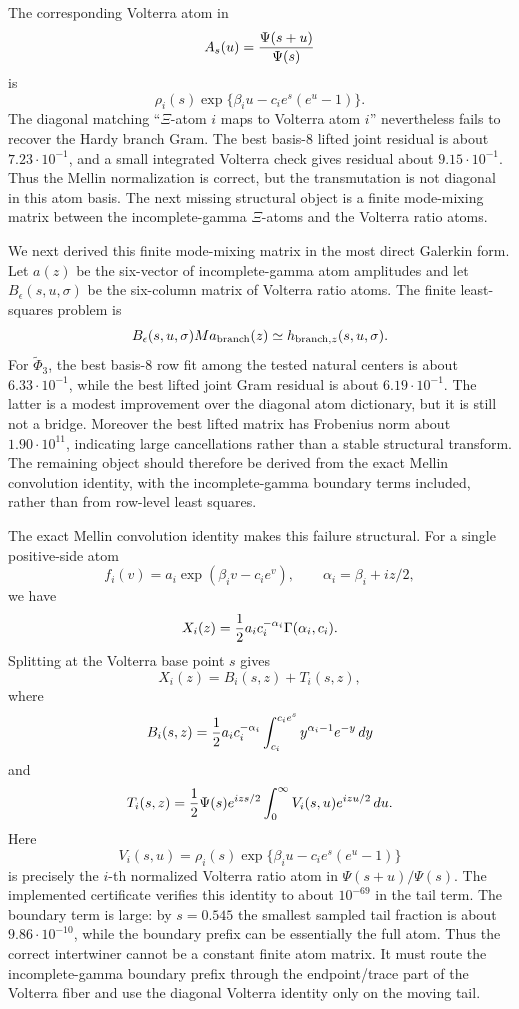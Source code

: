 \documentclass[11pt]{article}
\begin{document}
The corresponding Volterra atom in
\[
  A_s(u)={\Psi(s+u)\over\Psi(s)}
\]
is
\[
  \rho_i(s)\exp\{\beta_i u-c_i e^s(e^u-1)\}.
\]
The diagonal matching ``\(\Xi\)-atom \(i\) maps to Volterra atom \(i\)''
nevertheless fails to recover the Hardy branch Gram.  The best basis-8 lifted
joint residual is about \(7.23\cdot 10^{-1}\), and a small integrated
Volterra check gives residual about \(9.15\cdot 10^{-1}\).  Thus the Mellin
normalization is correct, but the transmutation is not diagonal in this atom
basis.  The next missing structural object is a finite mode-mixing matrix
between the incomplete-gamma \(\Xi\)-atoms and the Volterra ratio atoms.

We next derived this finite mode-mixing matrix in the most direct Galerkin
form.  Let \(a(z)\) be the six-vector of incomplete-gamma atom amplitudes and
let \(B_\epsilon(s,u,\sigma)\) be the six-column matrix of Volterra ratio
atoms.  The finite least-squares problem is
\[
  B_\epsilon(s,u,\sigma) M a_{\rm branch}(z)
  \simeq h_{{\rm branch},z}(s,u,\sigma).
\]
For \(\widetilde\Phi_3\), the best basis-8 row fit among the tested natural
centers is about \(6.33\cdot 10^{-1}\), while the best lifted joint Gram
residual is about \(6.19\cdot 10^{-1}\).  The latter is a modest improvement
over the diagonal atom dictionary, but it is still not a bridge.  Moreover the
best lifted matrix has Frobenius norm about \(1.90\cdot 10^{11}\), indicating
large cancellations rather than a stable structural transform.  The remaining
object should therefore be derived from the exact Mellin convolution identity,
with the incomplete-gamma boundary terms included, rather than from row-level
least squares.

The exact Mellin convolution identity makes this failure structural.  For a
single positive-side atom
\[
  f_i(v)=a_i\exp(\beta_i v-c_i e^v),\qquad
  \alpha_i=\beta_i+iz/2,
\]
we have
\[
  X_i(z)= {1\over 2}a_i c_i^{-\alpha_i}\Gamma(\alpha_i,c_i).
\]
Splitting at the Volterra base point \(s\) gives
\[
  X_i(z)=B_i(s,z)+T_i(s,z),
\]
where
\[
  B_i(s,z)= {1\over 2}a_i c_i^{-\alpha_i}
  \int_{c_i}^{c_i e^s} y^{\alpha_i-1}e^{-y}\,dy
\]
and
\[
  T_i(s,z)= {1\over 2}\Psi(s)e^{izs/2}
  \int_0^\infty V_i(s,u)e^{izu/2}\,du.
\]
Here
\[
  V_i(s,u)=\rho_i(s)\exp\{\beta_i u-c_i e^s(e^u-1)\}
\]
is precisely the \(i\)-th normalized Volterra ratio atom in
\(\Psi(s+u)/\Psi(s)\).  The implemented certificate verifies this identity
to about \(10^{-69}\) in the tail term.  The boundary term is large: by
\(s=0.545\) the smallest sampled tail fraction is about \(9.86\cdot 10^{-10}\),
while the boundary prefix can be essentially the full atom.  Thus the correct
intertwiner cannot be a constant finite atom matrix.  It must route the
incomplete-gamma boundary prefix through the endpoint/trace part of the
Volterra fiber and use the diagonal Volterra identity only on the moving tail.
\end{document}
